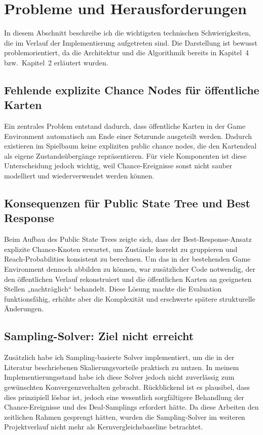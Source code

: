\section{Probleme und Herausforderungen}
In diesem Abschnitt beschreibe ich die wichtigsten technischen Schwierigkeiten, die im Verlauf der Implementierung aufgetreten sind.
Die Darstellung ist bewusst problemorientiert, da die Architektur und die Algorithmik bereits in Kapitel~4 bzw.\ Kapitel~2 erläutert wurden.

\subsection{Fehlende explizite Chance Nodes für öffentliche Karten}
Ein zentrales Problem entstand dadurch, dass öffentliche Karten in der Game Environment automatisch am Ende einer Setzrunde ausgeteilt werden.
Dadurch existieren im Spielbaum keine expliziten public chance nodes, die den Kartendeal als eigene Zustandsübergänge repräsentieren.
Für viele Komponenten ist diese Unterscheidung jedoch wichtig, weil Chance-Ereignisse sonst nicht sauber modelliert und wiederverwendet werden können.

\subsection{Konsequenzen für Public State Tree und Best Response}
Beim Aufbau des Public State Trees zeigte sich, dass der Best-Response-Ansatz explizite Chance-Knoten erwartet, um Zustände korrekt zu gruppieren und Reach-Probabilities konsistent zu berechnen.
Um das in der bestehenden Game Environment dennoch abbilden zu können, war zusätzlicher Code notwendig, der den öffentlichen Verlauf rekonstruiert und die öffentlichen Karten an geeigneten Stellen „nachträglich“ behandelt.
Diese Lösung machte die Evaluation funktionsfähig, erhöhte aber die Komplexität und erschwerte spätere strukturelle Änderungen.

\subsection{Sampling-Solver: Ziel nicht erreicht}
Zusätzlich habe ich Sampling-basierte Solver implementiert, um die in der Literatur beschriebenen Skalierungsvorteile praktisch zu nutzen.
In meinem Implementierungsstand habe ich diese Solver jedoch nicht zuverlässig zum gewünschten Konvergenzverhalten gebracht.
Rückblickend ist es plausibel, dass dies prinzipiell lösbar ist, jedoch eine wesentlich sorgfältigere Behandlung der Chance-Ereignisse und des Deal-Samplings erfordert hätte.
Da diese Arbeiten den zeitlichen Rahmen gesprengt hätten, wurden die Sampling-Solver im weiteren Projektverlauf nicht mehr als Kernvergleichsbaseline betrachtet.

